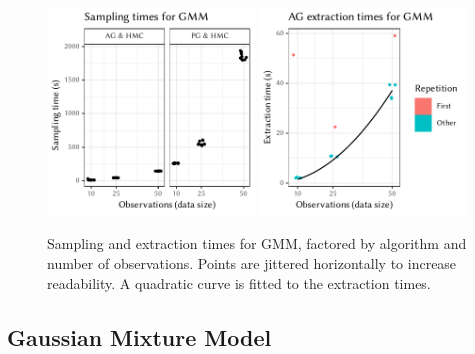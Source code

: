 \cleartoverso
\FloatBlock

\newcommand{\leftplotcaption}[1]{%
  Sampling and extraction times for #1, factored by algorithm and number of observations.  Points
  are jittered horizontally to increase readability.  A quadratic curve is fitted to the extraction
  times.  } \newcommand{\rightplotcaption}[1]{%
  Diagnostics, factored by algorithm, number of observations, and a selection of model parameters.
  \(\widehat{\mathrm{R}}\) and ESS point estimates are jittered horizontally for better readability.
  A horizontal line marks the reference value of \(1.1\) in the \(\widehat{\mathrm{R}}\) plot.  For
  chain plots and autocorrelation, the third chain of the respective combination has been used.  }

\begin{figure}[t!]
  \centering
  \includegraphics[width=0.49\textwidth]{figures/GMM-sampling_times}
  \includegraphics[width=0.49\textwidth]{figures/GMM-compile_times}
  \caption{\leftplotcaption{GMM}}
  \label{fig:plots-gmm}
\end{figure}

\subsection*{Gaussian Mixture Model}

